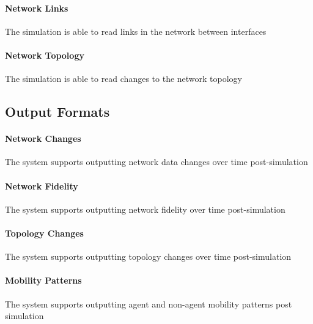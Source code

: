 \documentclass[titlepage]{article}
\begin{document}
    \paragraph{Network Links} The simulation is able to read links in the network between interfaces
    \paragraph{Network Topology} The simulation is able to read changes to the network topology



\subsection{Output Formats%
  \label{output-formats}%
}

  \paragraph{Network Changes} The system supports outputting network data changes over time post-simulation
  \paragraph{Network Fidelity} The system supports outputting network fidelity over time post-simulation
	\paragraph{Topology Changes} The system supports outputting topology changes over time post-simulation
	\paragraph{Mobility Patterns} The system supports outputting agent and non-agent mobility patterns post simulation
\end{document}
